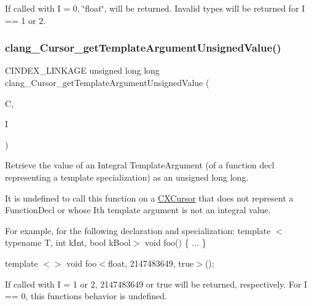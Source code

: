 If called with I = 0, \char`\"{}float\char`\"{}, will be returned. Invalid types will be returned for I == 1 or 2. \mbox{\label{group__CINDEX__TYPES_ga08dac49044448c022457224e73223eb2}} 
\subsubsection{\texorpdfstring{clang\+\_\+\+Cursor\+\_\+get\+Template\+Argument\+Unsigned\+Value()}{clang\_Cursor\_getTemplateArgumentUnsignedValue()}}
{\footnotesize\ttfamily C\+I\+N\+D\+E\+X\+\_\+\+L\+I\+N\+K\+A\+GE unsigned long long clang\+\_\+\+Cursor\+\_\+get\+Template\+Argument\+Unsigned\+Value (\begin{DoxyParamCaption}\item[{\hyperlink{structCXCursor}{C\+X\+Cursor}}]{C,  }\item[{unsigned}]{I }\end{DoxyParamCaption})}



Retrieve the value of an Integral Template\+Argument (of a function decl representing a template specialization) as an unsigned long long. 

It is undefined to call this function on a \hyperlink{structCXCursor}{C\+X\+Cursor} that does not represent a Function\+Decl or whose I\textquotesingle{}th template argument is not an integral value.

For example, for the following declaration and specialization\+: template $<$typename T, int k\+Int, bool k\+Bool$>$ void foo() \{ ... \}

template $<$$>$ void foo$<$float, 2147483649, true$>$();

If called with I = 1 or 2, 2147483649 or true will be returned, respectively. For I == 0, this function\textquotesingle{}s behavior is undefined. \mbox{\label{group__CINDEX__TYPES_ga46e363545effaa0794a2ba4bcfae1fe3}} 
